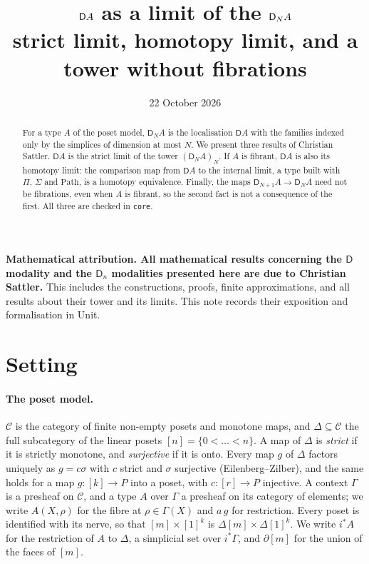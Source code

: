 \documentclass[11pt]{article}
\title{$\D A$ as a limit of the $\D_NA$\\[3pt]
\large strict limit, homotopy limit, and a tower without fibrations}
\author{}
\date{22 October 2026}
\newcommand{\C}{\mathcal{C}}
\newcommand{\Path}{\mathrm{Path}}
\newcommand{\D}{\mathsf{D}}
\theoremstyle{plain}
\theoremstyle{definition}
\theoremstyle{remark}
\begin{document}
\maketitle

\noindent\textbf{Mathematical attribution. All mathematical results
concerning the $\D$ modality and the $\D_n$ modalities presented here are
due to Christian Sattler.} This includes the constructions, proofs,
finite approximations, and all results about their tower and its limits.
This note records their exposition and formalisation in Unit.

\begin{abstract}
\noindent
For a type $A$ of the poset model, $\D_NA$ is the localisation $\D A$
with the families indexed only by the simplices of dimension at most $N$.
We present three results of Christian Sattler. $\D A$ is the strict limit
of the tower $(\D_NA)_N$. If $A$ is fibrant, $\D A$ is also its homotopy
limit: the comparison map from $\D A$ to the internal limit, a type built
with $\Pi$, $\Sigma$ and $\Path$, is a homotopy equivalence. Finally, the
maps $\D_{N+1}A\to\D_NA$ need not be fibrations, even when $A$ is fibrant,
so the second fact is not a consequence of the first. All three are checked
in \texttt{core}.
\end{abstract}

\section{Setting}\label{sec:tower}

\paragraph{The poset model.} $\C$ is the category of finite non-empty
posets and monotone maps, and $\Delta\subseteq\C$ the full subcategory of
the linear posets $[n]=\{0<\dots<n\}$. A map of $\Delta$ is \emph{strict}
if it is strictly monotone, and \emph{surjective} if it is onto. Every map
$g$ of $\Delta$ factors uniquely as $g=c\sigma$ with $c$ strict and
$\sigma$ surjective (Eilenberg--Zilber), and the same holds for a map
$g:[k]\to P$ into a poset, with $c:[r]\to P$ injective. A context $\Gamma$
is a presheaf on $\C$, and a type $A$ over $\Gamma$ a presheaf on its
category of elements; we write $A(X,\rho)$ for the fibre at $\rho\in\Gamma(X)$
and $a\,g$ for restriction. Every poset is identified with its nerve, so
that $[m]\times[1]^k$ is $\Delta[m]\times\Delta[1]^k$. We write $i^*A$ for
the restriction of $A$ to $\Delta$, a simplicial set over $i^*\Gamma$, and
$\partial[m]$ for the union of the faces of $[m]$.
\end{document}
